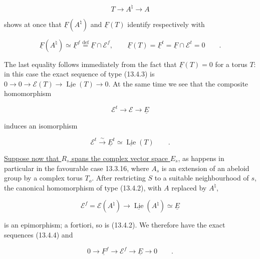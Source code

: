 \begin{equation*}
 T\longrightarrow A^\natural\longrightarrow A
\end{equation*}

\noindent
shows at once that $\underline F(A^\natural)$ and $\underline F(T)$
identify respectively with

\begin{equation}\tag{13.4.10}
 \underline F(A^\natural)\simeq
 \underline F^f\stackrel{\mathrm{def}}{=}
 \underline F\cap\mathcal E^f,
 \qquad
 \underline F(T)=\underline F^t=
 \underline F\cap\mathcal E^t=0\qquad .
\end{equation}

\noindent
The last equality follows immediately from the fact that
$\underline F(T)=0$ for a torus $T$: in this case the exact sequence of
type (13.4.3) is
$0\longrightarrow0\longrightarrow\mathcal E(T)
\longrightarrow\underline{\operatorname{Lie}}(T)\longrightarrow0$.
At the same time we see that the composite homomorphism

\begin{equation*}
 \mathcal E^t\longrightarrow\mathcal E\longrightarrow\underline E
\end{equation*}

\noindent
induces an isomorphism

\begin{equation}\tag{13.4.11}
 \mathcal E^t\stackrel{\sim}{\longrightarrow}\underline E^t
 \simeq\underline{\operatorname{Lie}}(T)\qquad .
\end{equation}

\noindent
\underline{Suppose now that $R_s$ spans the complex vector space $E_s$},
as happens in particular in the favourable case 13.3.16, where $A_s$ is
an extension of an abeloid group by a complex torus $T_o$.  After
restricting $S$ to a suitable neighbourhood of $s$, the canonical
homomorphism of type (13.4.2), with $A$ replaced by $A^\natural$,

\begin{equation*}
 \mathcal E^f=\mathcal E(A^\natural)
 \longrightarrow\underline{\operatorname{Lie}}(A^\natural)
 \simeq\underline E
\end{equation*}

\noindent
is an epimorphism; a fortiori, so is (13.4.2).  We therefore have the
exact sequences (13.4.4) and

\begin{equation}\tag{13.4.12}
 0\longrightarrow\underline F^f\longrightarrow\mathcal E^f
 \longrightarrow\underline E\longrightarrow0\qquad .
\end{equation}

